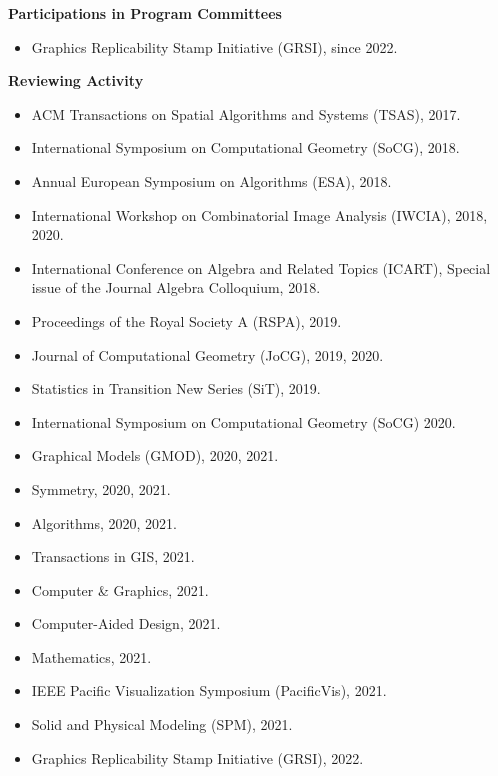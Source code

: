 \documentclass[11pt]{article}
\begin{document}
\vspace*{1ex}
\noindent
{\bf Participations in Program Committees}
\begin{itemize}
  \item Graphics Replicability Stamp Initiative (GRSI), since 2022.
\end{itemize}

\vspace*{1ex}
\noindent
{\bf Reviewing Activity}
\begin{itemize}
  \item ACM Transactions on Spatial Algorithms and Systems (TSAS), 2017.
  \item International Symposium on Computational Geometry (SoCG), 2018.
  \item Annual European Symposium on Algorithms (ESA), 2018.
  \item International Workshop on Combinatorial Image Analysis (IWCIA), 2018, 2020.
  \item International Conference on Algebra and Related Topics (ICART), Special issue of the Journal Algebra Colloquium, 2018.
  \item Proceedings of the Royal Society A (RSPA), 2019.
  \item Journal of Computational Geometry (JoCG), 2019, 2020.
  \item Statistics in Transition New Series (SiT), 2019.
  \item International Symposium on Computational Geometry (SoCG) 2020.
  \item Graphical Models (GMOD), 2020, 2021.
  \item Symmetry, 2020, 2021.
  \item Algorithms, 2020, 2021.
  \item Transactions in GIS, 2021.
  \item Computer \& Graphics, 2021.
  \item Computer-Aided Design, 2021.
  \item Mathematics, 2021.
  \item IEEE Pacific Visualization Symposium (PacificVis), 2021.
  \item Solid and Physical Modeling (SPM), 2021.
  \item Graphics Replicability Stamp Initiative (GRSI), 2022.
\end{itemize}
\end{document}
